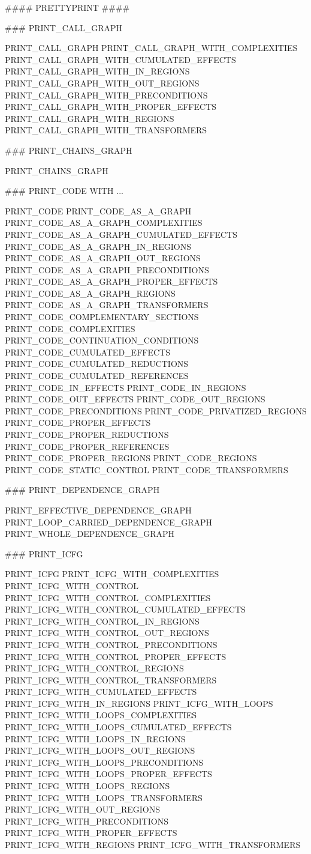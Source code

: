 \documentclass[a4paper]{article}
\begin{document}
\begin{verbatim*}
#### PRETTYPRINT #### 

### PRINT_CALL_GRAPH                          

PRINT_CALL_GRAPH                          
PRINT_CALL_GRAPH_WITH_COMPLEXITIES        
PRINT_CALL_GRAPH_WITH_CUMULATED_EFFECTS   
PRINT_CALL_GRAPH_WITH_IN_REGIONS          
PRINT_CALL_GRAPH_WITH_OUT_REGIONS         
PRINT_CALL_GRAPH_WITH_PRECONDITIONS       
PRINT_CALL_GRAPH_WITH_PROPER_EFFECTS      
PRINT_CALL_GRAPH_WITH_REGIONS             
PRINT_CALL_GRAPH_WITH_TRANSFORMERS        

### PRINT_CHAINS_GRAPH                        

PRINT_CHAINS_GRAPH                        

### PRINT_CODE  WITH ...                             

PRINT_CODE                                
PRINT_CODE_AS_A_GRAPH                     
PRINT_CODE_AS_A_GRAPH_COMPLEXITIES        
PRINT_CODE_AS_A_GRAPH_CUMULATED_EFFECTS   
PRINT_CODE_AS_A_GRAPH_IN_REGIONS          
PRINT_CODE_AS_A_GRAPH_OUT_REGIONS         
PRINT_CODE_AS_A_GRAPH_PRECONDITIONS       
PRINT_CODE_AS_A_GRAPH_PROPER_EFFECTS      
PRINT_CODE_AS_A_GRAPH_REGIONS             
PRINT_CODE_AS_A_GRAPH_TRANSFORMERS        
PRINT_CODE_COMPLEMENTARY_SECTIONS         
PRINT_CODE_COMPLEXITIES                   
PRINT_CODE_CONTINUATION_CONDITIONS        
PRINT_CODE_CUMULATED_EFFECTS              
PRINT_CODE_CUMULATED_REDUCTIONS           
PRINT_CODE_CUMULATED_REFERENCES           
PRINT_CODE_IN_EFFECTS                     
PRINT_CODE_IN_REGIONS                     
PRINT_CODE_OUT_EFFECTS                    
PRINT_CODE_OUT_REGIONS
PRINT_CODE_PRECONDITIONS
PRINT_CODE_PRIVATIZED_REGIONS
PRINT_CODE_PROPER_EFFECTS
PRINT_CODE_PROPER_REDUCTIONS
PRINT_CODE_PROPER_REFERENCES
PRINT_CODE_PROPER_REGIONS
PRINT_CODE_REGIONS
PRINT_CODE_STATIC_CONTROL
PRINT_CODE_TRANSFORMERS

### PRINT_DEPENDENCE_GRAPH

PRINT_EFFECTIVE_DEPENDENCE_GRAPH
PRINT_LOOP_CARRIED_DEPENDENCE_GRAPH
PRINT_WHOLE_DEPENDENCE_GRAPH

### PRINT_ICFG

PRINT_ICFG
PRINT_ICFG_WITH_COMPLEXITIES
PRINT_ICFG_WITH_CONTROL
PRINT_ICFG_WITH_CONTROL_COMPLEXITIES
PRINT_ICFG_WITH_CONTROL_CUMULATED_EFFECTS
PRINT_ICFG_WITH_CONTROL_IN_REGIONS
PRINT_ICFG_WITH_CONTROL_OUT_REGIONS
PRINT_ICFG_WITH_CONTROL_PRECONDITIONS
PRINT_ICFG_WITH_CONTROL_PROPER_EFFECTS
PRINT_ICFG_WITH_CONTROL_REGIONS
PRINT_ICFG_WITH_CONTROL_TRANSFORMERS
PRINT_ICFG_WITH_CUMULATED_EFFECTS
PRINT_ICFG_WITH_IN_REGIONS
PRINT_ICFG_WITH_LOOPS
PRINT_ICFG_WITH_LOOPS_COMPLEXITIES
PRINT_ICFG_WITH_LOOPS_CUMULATED_EFFECTS
PRINT_ICFG_WITH_LOOPS_IN_REGIONS
PRINT_ICFG_WITH_LOOPS_OUT_REGIONS
PRINT_ICFG_WITH_LOOPS_PRECONDITIONS
PRINT_ICFG_WITH_LOOPS_PROPER_EFFECTS
PRINT_ICFG_WITH_LOOPS_REGIONS
PRINT_ICFG_WITH_LOOPS_TRANSFORMERS
PRINT_ICFG_WITH_OUT_REGIONS
PRINT_ICFG_WITH_PRECONDITIONS
PRINT_ICFG_WITH_PROPER_EFFECTS
PRINT_ICFG_WITH_REGIONS
PRINT_ICFG_WITH_TRANSFORMERS


\end{verbatim*}
\end{document}

